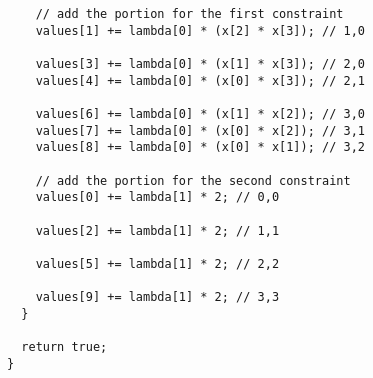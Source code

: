 \documentclass[letter,10pt]{article}
\begin{document}
{\begin{verbatim}
    // add the portion for the first constraint
    values[1] += lambda[0] * (x[2] * x[3]); // 1,0
    
    values[3] += lambda[0] * (x[1] * x[3]); // 2,0
    values[4] += lambda[0] * (x[0] * x[3]); // 2,1

    values[6] += lambda[0] * (x[1] * x[2]); // 3,0
    values[7] += lambda[0] * (x[0] * x[2]); // 3,1
    values[8] += lambda[0] * (x[0] * x[1]); // 3,2

    // add the portion for the second constraint
    values[0] += lambda[1] * 2; // 0,0

    values[2] += lambda[1] * 2; // 1,1

    values[5] += lambda[1] * 2; // 2,2

    values[9] += lambda[1] * 2; // 3,3
  }

  return true;
}
\end{verbatim}

}
\end{document}
